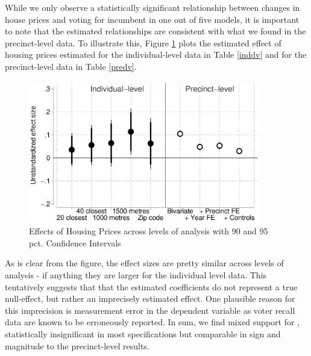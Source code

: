 \documentclass[12pt,a4paper]{article}
\begin{document}
	While we only observe a statistically significant relationship between changes in house prices and voting for incumbent in one out of five models, it is important to note that the estimated relationships are consistent with what we found in the precinct-level data. To illustrate this, Figure \ref{comparison} plots the estimated effect of housing prices estimated for the individual-level data in Table \ref{inddv}  and for the precinct-level data in Table \ref{predv}.
	
	\begin{figure}[htbp!]
		\includegraphics[width=0.9\textwidth]{../figures/comparison.eps}
		\centering
		\caption{Effects of Housing Prices across levels of analysis with 90  and 95 pct. Confidence Intervals}\label{comparison}
	\end{figure}
	
	As is clear from the figure, the effect sizes are pretty similar across levels of analysis - if anything they are larger for the individual level data. This tentatively suggests that that the estimated coefficients do not represent a true null-effect, but rather an imprecisely estimated effect. One plausible reason for this imprecision is measurement error in the dependent variable as voter recall data are known to be erroneously reported. In sum, we find mixed support for \hone, statistically insignificant in most specifications but comparable in sign and magnitude to the precinct-level results.
	
	
	
\end{document}
